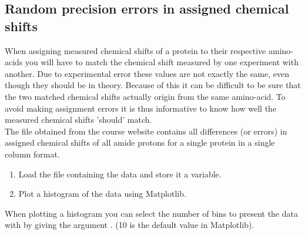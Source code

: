 \documentclass{article}
\begin{document}
\newpage
\iffalse
\subsection{Random precision errors in assigned chemical shifts}

When assigning measured chemical shifts of a protein to their respective amino-acids you will have to match the chemical shift measured by one experiment with another.
Due to experimental error these values are not exactly the same, even though they should be in theory.
Because of this it can be difficult to be sure that the two matched chemical shifts actually origin from the same amino-acid.
To avoid making assignment errors it is thus informative to know how well the measured chemical shifts 'should' match.\\

The file  obtained from the course website contains all differences (or errors) in assigned chemical shifts of all amide protons for a single protein in a single column format.


\begin{enumerate}

    \item Load the file containing the data and store it a variable.

    \item Plot a histogram of the data using Matplotlib.

\end{enumerate}

When plotting a histogram you can select the number of bins to present the data with by giving the argument . (10 is the default value in Matplotlib).
%

%
%
\end{document}
